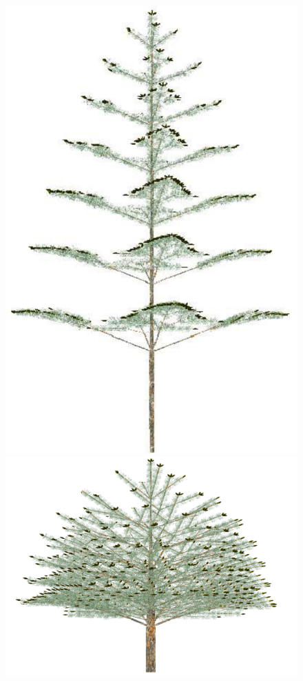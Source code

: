 \begin{figure}
\includegraphics[scale=0.25]{pineL8}
\includegraphics[scale=0.20]{pine8FEM98}

\end{figure}
